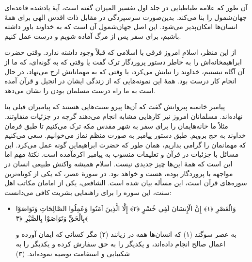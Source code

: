 آن طور که علامه طباطبایی در جلد اول تفسیر المیزان گفته است، آیهٔ یادشده قاعده‌ای جهان‌شمول را بنا می‌کند. بدین‌صورت  سرسپردگی در مقابل ذات اقدس الهی برای همهٔ انسان‌ها امکان‌پذیر می‌شود. این اصل جهان‌شمول آن است که به خداوند باور داشته باشیم، برای سفر پس از مرگ آماده شویم و درست عمل کنیم.

از این منظر، اسلامِ امروز فرقی با اسلامی که قبلاً وجود داشته ندارد. وقتی حضرت ابراهیم{}خانه‌اش را به خاطر دستور پروردگار ترک گفت یا وقتی که به گونه‌ای، که ما از آن آگاه نیستیم، خداوند را  نیایش می‌کرد، یا وقتی که به مهمانانش ارج می‌نهاد، در حال انجام کار درست بود. همهٔ این نمونه‌هایی که از زندگی ایشان در انجیل و قرآن آمده است به ما راه درست مسلمان بودن را نشان می‌دهد.

پیامبر خاتم{}به پیروانش گفت که آن‌ها پیرو سنت‌هایی هستند که پیامبران قبلی بنا نهاده‌اند. مسلمانان امروز نیز کارهایی مشابه انجام می‌دهند گرچه در جزئیات متفاوتند. مثلاً ما خانه‌هایمان را برای سفر به شهر مقدس مکه ترک می‌کنیم تا طبق فرمان خداوند به حج برویم. طبق دستور پیامبر{} به صورت منظم نماز می‌خوانیم.  سعی می‌کنیم که مهمانمان را گرامی بداریم، همان طور که حضرت ابراهیم{}این گونه عمل می‌کرد. این مسائل با جزئیات در قرآن و تعلیمات منسوب به پیامبر اکرم{}آمده است. نکتهٔ مهم اما این است که همهٔ این‌ها چیز جدیدی نیست. اسلام همیشه واکنش طبیعی انسان در مواجهه با پروردگار بوده، هست و خواهد بود. در سوره‌ٔ عصر، که یکی از کوتاه‌ترین سوره‌های قرآن است، این مسأله بیان شده است. الشافعی، یکی از امامان مکاتب اهل سنت، این سوره را برای راهنمایی بشریت کافی می‌دانست:

\begin{itemize}
	\item[]
	{
		
		وَالْعَصْرِ ﴿١﴾ إِنَّ الْإِنسَانَ لَفِي خُسْرٍ ﴿٢﴾ إِلَّا الَّذِينَ آمَنُوا وَعَمِلُوا الصَّالِحَاتِ وَتَوَاصَوْا بِالْحَقِّ وَتَوَاصَوْا بِالصَّبْرِ ﴿٣﴾}
	
	{
		به عصر سوگند (۱) که انسان‌ها همه در زیانند (۲) مگر کسانی که ایمان آورده و اعمال صالح انجام داده‌اند، و یکدیگر را به حق سفارش کرده و یکدیگر را به شکیبایی و استقامت توصیه نموده‌اند. (۳)}
\end{itemize}


